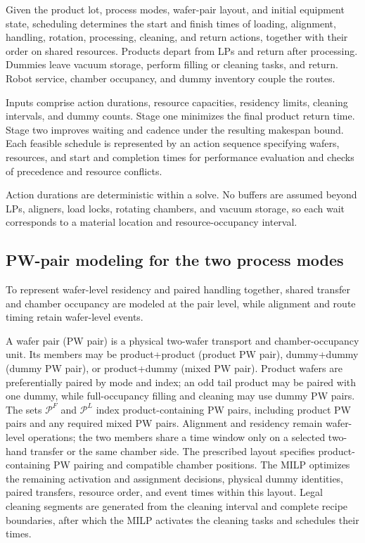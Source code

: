 \documentclass[journal]{IEEEtran}
\begin{document}
Given the product lot, process modes, wafer-pair layout, and initial equipment state, scheduling determines the start and finish times of loading, alignment, handling, rotation, processing, cleaning, and return actions, together with their order on shared resources. Products depart from LPs and return after processing. Dummies leave vacuum storage, perform filling or cleaning tasks, and return. Robot service, chamber occupancy, and dummy inventory couple the routes.

Inputs comprise action durations, resource capacities, residency limits, cleaning intervals, and dummy counts. Stage one minimizes the final product return time. Stage two improves waiting and cadence under the resulting makespan bound. Each feasible schedule is represented by an action sequence specifying wafers, resources, and start and completion times for performance evaluation and checks of precedence and resource conflicts.

Action durations are deterministic within a solve. No buffers are assumed beyond LPs, aligners, load locks, rotating chambers, and vacuum storage, so each wait corresponds to a material location and resource-occupancy interval.

\subsection{PW-pair modeling for the two process modes}

To represent wafer-level residency and paired handling together, shared transfer and chamber occupancy are modeled at the pair level, while alignment and route timing retain wafer-level events.

A wafer pair (PW pair) is a physical two-wafer transport and chamber-occupancy unit. Its members may be product+product (product PW pair), dummy+dummy (dummy PW pair), or product+dummy (mixed PW pair). Product wafers are preferentially paired by mode and index; an odd tail product may be paired with one dummy, while full-occupancy filling and cleaning may use dummy PW pairs. The sets $\mathcal P^F$ and $\mathcal P^L$ index product-containing PW pairs, including product PW pairs and any required mixed PW pairs. Alignment and residency remain wafer-level operations; the two members share a time window only on a selected two-hand transfer or the same chamber side. The prescribed layout specifies product-containing PW pairing and compatible chamber positions. The MILP optimizes the remaining activation and assignment decisions, physical dummy identities, paired transfers, resource order, and event times within this layout. Legal cleaning segments are generated from the cleaning interval and complete recipe boundaries, after which the MILP activates the cleaning tasks and schedules their times.
\end{document}
